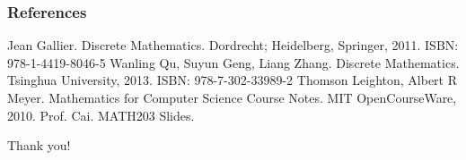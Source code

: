 \documentclass[aspectratio=169]{beamer}
\begin{document}
\begin{frame}
  \frametitle{References}
  
  \begin{thebibliography}{99} %
     Jean Gallier. Discrete Mathematics. Dordrecht; Heidelberg, Springer, 2011. ISBN: 978-1-4419-8046-5 
     Wanling Qu, Suyun Geng, Liang Zhang. Discrete Mathematics. Tsinghua University, 2013. ISBN: 978-7-302-33989-2
     Thomson Leighton, Albert R Meyer. Mathematics for Computer Science Course Notes. MIT OpenCourseWare, 2010.
     Prof. Cai. MATH203 Slides.
  \end{thebibliography}
\end{frame}

\begin{frame}
  \Huge{\centerline{Thank you!}}
\end{frame}
\end{document}
